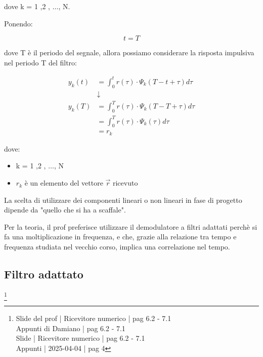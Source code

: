 dove k = 1 ,2 , $\dots$, N. \newline 

Ponendo: 

{
    \Large 
    \begin{equation}
        t = T
    \end{equation}
}

dove T è il periodo del segnale, allora possiamo considerare la risposta impulsiva nel periodo T del filtro: 

{
    \Large 
    \begin{equation}
        \begin{split}
           y_k (t)
        &= 
        \int_{0}^{t}
        r(\tau) \cdot \Psi_k (T - t + \tau) d\tau
        \\
        &\downarrow
        \\
        y_k (T)
        &= 
        \int_{0}^{T}
        r(\tau) \cdot \Psi_k (T - T + \tau) d\tau 
        \\
        &=
        \int_{0}^{T}
        r(\tau) \cdot \Psi_k (\tau) d\tau
        \\
        &= 
        r_k  
        \end{split}
    \end{equation}
}

dove: 

\begin{itemize}
    \item k = 1 ,2 , $\dots$, N 
    \item $r_k$ è un elemento del vettore $\overrightarrow{r}$ ricevuto 
\end{itemize}

\begin{tcolorbox}
    La scelta di utilizzare dei componenti lineari o non lineari in fase di progetto dipende da "quello che si ha a scaffale". \newline 

    Per la teoria, il prof preferisce utilizzare il demodulatore a filtri adattati perchè si fa una moltiplicazione in frequenza, 
    e che, grazie alla relazione tra tempo e frequenza studiata nel vecchio corso, implica una correlazione nel tempo. 

\end{tcolorbox} 


\newpage 

\subsection{Filtro adattato}
\footnote{Slide del prof | Ricevitore numerico | pag 6.2 - 7.1\\  
Appunti di Damiano | pag 6.2 - 7.1\\
Slide | Ricevitore numerico | pag 6.2 - 7.1 \\
Appunti | 2025-04-04 | pag 4
}

